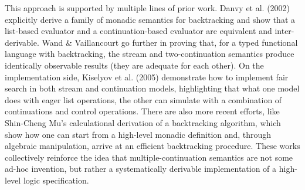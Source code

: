 \documentclass[screen,anonymous,review,draft,natbib=false]{acmart} %
\begin{document}
This approach is supported by multiple lines of prior work. Danvy et al. (2002) explicitly derive a family of monadic semantics for backtracking and show that a list-based evaluator and a continuation-based evaluator are equivalent and inter-derivable. Wand \& Vaillancourt go further in proving that, for a typed functional language with backtracking, the stream and two-continuation semantics produce identically observable results (they are adequate for each other). On the implementation side, Kiselyov et al. (2005) demonstrate how to implement fair search in both stream and continuation models, highlighting that what one model does with eager list operations, the other can simulate with a combination of continuations and control operations. There are also more recent efforts, like Shin-Cheng Mu’s calculational derivation of a backtracking algorithm, which show how one can start from a high-level monadic definition and, through algebraic manipulation, arrive at an efficient backtracking procedure. These works collectively reinforce the idea that multiple-continuation semantics are not some ad-hoc invention, but rather a systematically derivable implementation of a high-level logic specification.





\printbibliography{}
\end{document}
